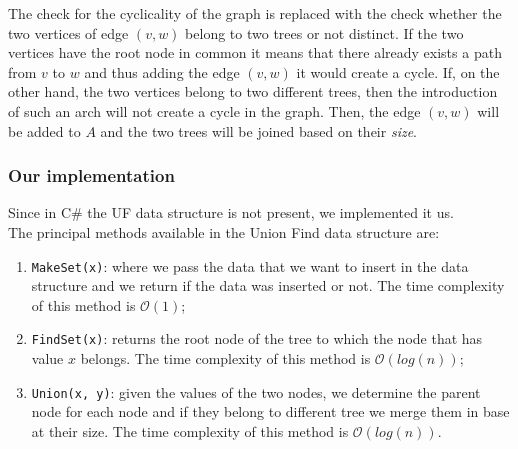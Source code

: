 The check for the cyclicality of the graph is replaced with the check whether the two vertices of edge $(v, w)$ 
belong to two trees or not distinct. If the two vertices have the root node in common it means that there already 
exists a path from $v$ to $w$ and thus adding the edge $(v, w)$ it would create a cycle.
If, on the other hand, the two vertices belong to two different trees, then the introduction of such an arch will 
not create a cycle in the graph.
Then, the edge $(v, w)$ will be added to $A$ and the two trees will be joined based on their \textit{size}.

\subsubsection{Our implementation}
Since in C\# the UF data structure is not present, we implemented it us.\\
The principal methods available in the Union Find data structure are:
\begin{enumerate}
    \item \verb|MakeSet(x)|: where we pass the data that we want to insert in the data structure and we return 
        if the data was inserted or not. The time complexity of this method is $\mathcal{O}(1)$;
    \item \verb|FindSet(x)|: returns the root node of the tree to which the node that has value $x$ belongs.
        The time complexity of this method is $\mathcal{O}(log(n))$;
    \item \verb|Union(x, y)|: given the values of the two nodes, we determine the parent node for each node and 
        if they belong to different tree we merge them in base at their size. The time complexity of this 
        method is $\mathcal{O}(log(n))$.
\end{enumerate}

